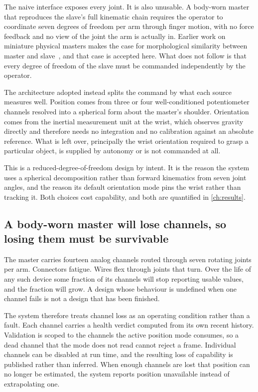 The naive interface exposes every joint. It is also unusable. A body-worn
master that reproduces the slave's full kinematic chain requires the operator
to coordinate seven degrees of freedom per arm through finger motion, with no
force feedback and no view of the joint the arm is actually in. Earlier work
on miniature physical masters makes the case for morphological similarity
between master and slave~\cite{guggenheim2021haptic}, and that case is
accepted here. What does not follow is that every degree of freedom of the
slave must be commanded independently by the operator.

The architecture adopted instead splits the command by what each source
measures well. Position comes from three or four well-conditioned
potentiometer channels resolved into a spherical form about the master's
shoulder. Orientation comes from the inertial measurement unit at the wrist,
which observes gravity directly and therefore needs no integration and no
calibration against an absolute reference. What is left over, principally the
wrist orientation required to grasp a particular object, is supplied by
autonomy or is not commanded at all.

This is a reduced-degree-of-freedom design by intent. It is the reason the
system uses a spherical decomposition rather than forward kinematics from
seven joint angles, and the reason its default orientation mode pins the wrist
rather than tracking it. Both choices cost capability, and both are quantified
in \cref{ch:results}.

\subsection{A body-worn master will lose channels, so losing them must be
survivable}

The master carries fourteen analog channels routed through seven rotating
joints per arm. Connectors fatigue. Wires flex through joints that turn. Over
the life of any such device some fraction of its channels will stop reporting
usable values, and the fraction will grow. A design whose behaviour is
undefined when one channel fails is not a design that has been finished.

The system therefore treats channel loss as an operating condition rather than
a fault. Each channel carries a health verdict computed from its own recent
history. Validation is scoped to the channels the active position mode
consumes, so a dead channel that the mode does not read cannot reject a frame.
Individual channels can be disabled at run time, and the resulting loss of
capability is published rather than inferred. When enough channels are lost
that position can no longer be estimated, the system reports position
unavailable instead of extrapolating one.

